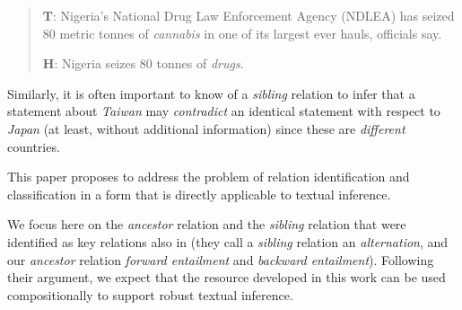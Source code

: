 {\small
  \begin{quote}

    {\bf T}: Nigeria's National Drug Law Enforcement Agency (NDLEA)
    has seized 80 metric tonnes of {\em cannabis} in one of its
    largest ever hauls, officials say.

    {\bf H}: Nigeria seizes 80 tonnes of {\em drugs}.
  \end{quote}
}

Similarly, it is often important to know of a {\em sibling} relation
to infer that a statement about {\em Taiwan} may {\em contradict} an
identical statement with respect to {\em Japan} (at least, without
additional information) since these are {\em different}
countries.


This paper proposes to address the problem of relation identification
and classification in a form that is directly applicable to textual
inference.    We focus here on the {\em ancestor} relation and the
{\em sibling} relation that were identified as key relations also in
\cite{maccartney-manning:2008:PAPERS} (they call a {\em sibling}
relation an {\em alternation}, and our {\em ancestor} relation {\em
  forward entailment} and {\em backward entailment}). Following their
argument, we expect that the resource developed in this work can be
used compositionally to support robust textual inference.


